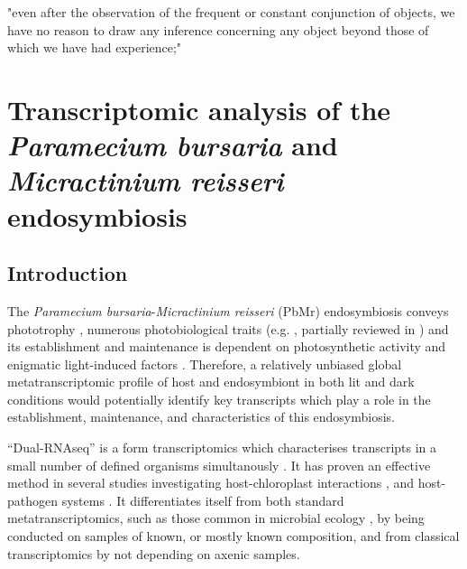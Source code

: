 \graphicspath{{chapters/4.Chapter2/figures/}}

\begin{savequote}[75mm]
"even after the observation of the frequent or constant conjunction of objects, we have no reason to draw any inference concerning any object beyond those of which we have had experience;"
\end{savequote}



\chapter{Transcriptomic analysis of the \textit{Paramecium bursaria} and \textit{Micractinium reisseri} endosymbiosis}

\section{Introduction}

The \textit{Paramecium bursaria}-\textit{Micractinium reisseri} (PbMr) endosymbiosis 
conveys phototrophy \citep{Karakashian1963}, numerous photobiological traits (e.g. \citep{Berk1991,Saji1974,Nakajima1989,Niess1982a,Iwatsuki1988,Summerer2009}, 
partially reviewed in \citep{Sommaruga2009}) and its establishment and maintenance 
is dependent on photosynthetic activity and enigmatic light-induced factors \citep{Karakashian1963,Hosoya1995a,Kodama2007,Kodama2014c}.
Therefore, a relatively unbiased global metatranscriptomic profile of host and endosymbiont in both lit and dark conditions 
would potentially identify key transcripts which play a role in the establishment, maintenance, and characteristics 
of this endosymbiosis. 


``Dual-RNAseq'' is a form transcriptomics which characterises transcripts in a small number of defined organisms simultanously \citep{Westermann2012}.
It has proven an effective method in several studies investigating host-chloroplast interactions \citep{Nowack2011,Jiggins2013,Xiang2015},
and host-pathogen systems \citep{Tieryney2012,Kawahara2012,Jones2014,Hayden2014}.
It differentiates itself from both standard metatranscriptomics, such as those common in microbial ecology \citep{Poretsky2005,AliagaGoltsman2014},
by being conducted on samples of known, or mostly known composition, and from classical transcriptomics
by not depending on axenic samples. 


